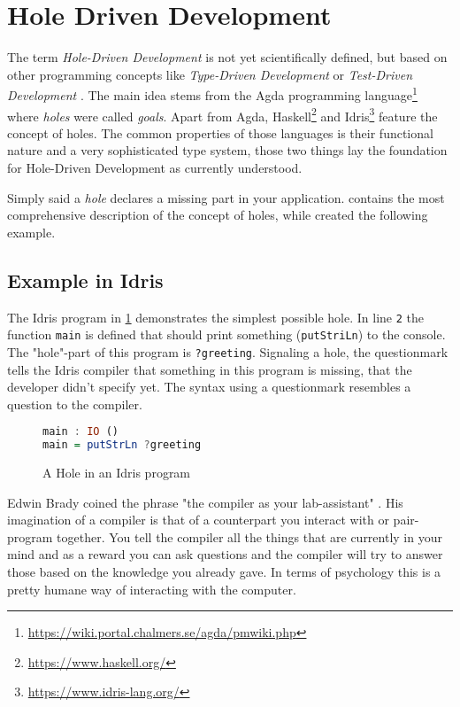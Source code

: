 \section{Hole Driven Development}
\label{sec:hole-driven-development}
The term \emph{Hole-Driven Development} is not yet scientifically defined, but based on other programming concepts like \emph{Type-Driven Development} \autocite{brady_type-driven_2017} or \emph{Test-Driven Development} \autocite{mccracken_digital_1957}.
The main idea stems from the Agda programming language\footnote{\url{https://wiki.portal.chalmers.se/agda/pmwiki.php}} where \emph{holes} were called \emph{goals}.
Apart from Agda, Haskell\footnote{\url{https://www.haskell.org/}} and Idris\footnote{\url{https://www.idris-lang.org/}} feature the concept of holes.
The common properties of those languages is their functional nature and a very sophisticated type system, those two things lay the foundation for Hole-Driven Development as currently understood.

Simply said a \emph{hole} declares a missing part in your application.
\textcite{gamari_haskell_2019} contains the most comprehensive description of the concept of holes, while \textcite{brady_type-driven_2017} created the following example.

\subsection{Example in Idris}
\label{sub:hole-driven-development-in-idris}
The Idris program in \ref{fig:idris-program-hole} demonstrates the simplest possible hole.
In line \verb|2| the function \verb|main| is defined that should print something (\verb|putStriLn|) to the console.
The "hole"-part of this program is \verb|?greeting|.
Signaling a hole, the questionmark tells the Idris compiler that something in this program is missing, that the developer didn't specify yet.
The syntax using a questionmark resembles a question to the compiler.

\begin{figure}[h!]
\begin{lstlisting}[language=Haskell,firstnumber=1]
main : IO ()
main = putStrLn ?greeting
\end{lstlisting}
\caption{A Hole in an Idris program}
\label{fig:idris-program-hole}
\end{figure}

Edwin Brady coined the phrase "the compiler as your lab-assistant" \autocite{brady_type-driven_2017}.
His imagination of a compiler is that of a counterpart you interact with or pair-program together.
You tell the compiler all the things that are currently in your mind and as a reward you can ask questions and the compiler will try to answer those based on the knowledge you already gave.
In terms of psychology this is a pretty humane way of interacting with the computer.

